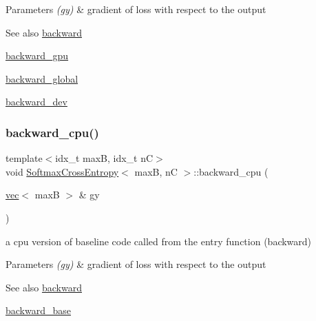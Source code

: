 \begin{DoxyParams}{Parameters}
{\em (gy)} & gradient of loss with respect to the output \\
\hline
\end{DoxyParams}
\begin{DoxySeeAlso}{See also}
\hyperlink{structSoftmaxCrossEntropy_afb506c6159bd6cd02a6c5e8426628fe0}{backward} 

\hyperlink{structSoftmaxCrossEntropy_a767b5a911be901ce811ffca5fb88af74}{backward\+\_\+gpu} 

\hyperlink{softmaxcrossentropy_8h_a47d56a9a23e08247b227f4aac17413e0}{backward\+\_\+global} 

\hyperlink{structSoftmaxCrossEntropy_ad7560f49148405e09d5a9a0a6ee0ee92}{backward\+\_\+dev} 
\end{DoxySeeAlso}
\mbox{\label{structSoftmaxCrossEntropy_ad486637359bf83f545a00b1e29584b35}} 
\subsubsection{\texorpdfstring{backward\+\_\+cpu()}{backward\_cpu()}}
{\footnotesize\ttfamily template$<$idx\+\_\+t maxB, idx\+\_\+t nC$>$ \\
void \hyperlink{structSoftmaxCrossEntropy}{Softmax\+Cross\+Entropy}$<$ maxB, nC $>$\+::backward\+\_\+cpu (\begin{DoxyParamCaption}\item[{\hyperlink{structvec}{vec}$<$ maxB $>$ \&}]{gy }\end{DoxyParamCaption})\hspace{0.3cm}{\ttfamily [inline]}}



a cpu version of baseline code called from the entry function (backward) 


\begin{DoxyParams}{Parameters}
{\em (gy)} & gradient of loss with respect to the output \\
\hline
\end{DoxyParams}
\begin{DoxySeeAlso}{See also}
\hyperlink{structSoftmaxCrossEntropy_afb506c6159bd6cd02a6c5e8426628fe0}{backward} 

\hyperlink{structSoftmaxCrossEntropy_a1cea37bcbeedb5749f56f740baa6ce92}{backward\+\_\+base} 
\end{DoxySeeAlso}
\mbox{\label{structSoftmaxCrossEntropy_ad7560f49148405e09d5a9a0a6ee0ee92}} 
